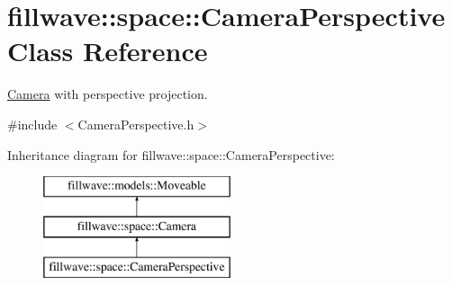 \hypertarget{classfillwave_1_1space_1_1CameraPerspective}{}\section{fillwave\+:\+:space\+:\+:Camera\+Perspective Class Reference}
\label{classfillwave_1_1space_1_1CameraPerspective}


\hyperlink{classfillwave_1_1space_1_1Camera}{Camera} with perspective projection.  




{\ttfamily \#include $<$Camera\+Perspective.\+h$>$}

Inheritance diagram for fillwave\+:\+:space\+:\+:Camera\+Perspective\+:\begin{figure}[H]
\begin{center}
\leavevmode
\includegraphics[height=3.000000cm]{classfillwave_1_1space_1_1CameraPerspective}
\end{center}
\end{figure}
